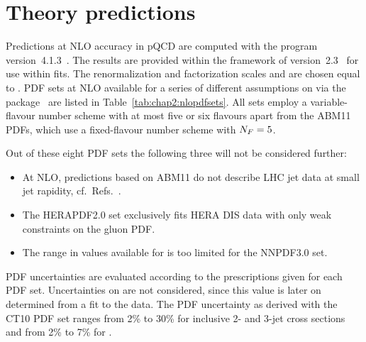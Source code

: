 \chapter{Theory predictions}
\label{sec:Theory_Predictions}

Predictions at NLO accuracy in pQCD are computed with the \NLOJETPP
program version~4.1.3~\cite{Nagy:2001fj,Nagy:2003tz}. The results are
provided within the framework of \fastNLO
version~2.3~\cite{Britzger:2012bs} for use within fits. The
renormalization and factorization scales \mur and \muf are chosen
equal to \httwo. PDF sets at NLO available for a series of different
assumptions on \alpsmz via the \LHAPDFS package~\cite{Buckley:2014ana}
are listed in Table~\ref{tab:chap2:nlopdfsets}. All sets employ a
variable-flavour number scheme with at most five or six flavours apart
from the ABM11 PDFs, which use a fixed-flavour number scheme with
$N_F=5$.

Out of these eight PDF sets the following three will not be considered
further:
%
\begin{itemize}
\item At NLO, predictions based on ABM11 do not describe LHC jet data
  at small jet rapidity, cf.\ Refs.~\cite{Aad:2013lpa, Aad:2014vwa,
    CMS:2014mna, Khachatryan:2015luy}.
\item The HERAPDF2.0 set exclusively fits HERA DIS data with only weak
  constraints on the gluon PDF\@.
\item The range in values available for \alpsmz is too limited for the
  NNPDF3.0 set.
\end{itemize}
%

PDF uncertainties are evaluated according to the prescriptions given
for each PDF set. Uncertainties on \alpsmz are not considered, since
this value is later on determined from a fit to the data. The PDF
uncertainty as derived with the CT10 PDF set ranges from 2\% to 30\%
for inclusive 2- and 3-jet cross sections and from 2\% to 7\% for \ratio.

